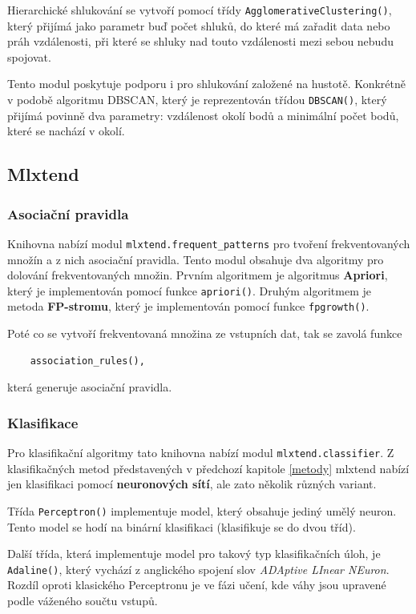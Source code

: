 Hierarchické shlukování se vytvoří pomocí třídy \verb|AgglomerativeClustering()|, který přijímá jako parametr buď počet shluků, do které má zařadit data nebo práh vzdálenosti, při které se shluky nad touto vzdálenosti mezi sebou nebudu spojovat. 

Tento modul poskytuje podporu i pro shlukování založené na hustotě. Konkrétně v podobě algoritmu DBSCAN, který je reprezentován třídou \verb|DBSCAN()|, který přijímá povinně dva parametry: vzdálenost okolí bodů a minimální počet bodů, které se nachází v okolí.

\subsection{Mlxtend}
\subsubsection*{Asociační pravidla}
Knihovna nabízí modul \verb|mlxtend.frequent_patterns| pro tvoření frekventovaných množín a z nich asociační pravidla. Tento modul obsahuje dva algoritmy pro dolování frekventovaných množin. Prvním algoritmem je algoritmus \textbf{Apriori}, který je implementován pomocí funkce \verb|apriori()|. Druhým algoritmem je metoda \textbf{FP-stromu}, který je implementován pomocí funkce \verb|fpgrowth()|. 

Poté co se vytvoří frekventovaná množina ze vstupních dat, tak se zavolá funkce \begin{verbatim}
    association_rules(),
\end{verbatim}která generuje asociační pravidla.

\subsubsection*{Klasifikace}
Pro klasifikační algoritmy tato knihovna nabízí modul \verb|mlxtend.classifier|. Z klasifikačných metod představených v předchozí kapitole \ref{metody} mlxtend nabízí jen klasifikaci pomocí \textbf{neuronových sítí}, ale zato několik různých variant. 

Třída \verb|Perceptron()| implementuje model, který obsahuje jediný umělý neuron. Tento model se hodí na binární klasifikaci (klasifikuje se do dvou tříd). 

Další třída, která implementuje model pro takový typ klasifikačních úloh, je \verb|Adaline()|, který vychází z anglického spojení slov \textit{ADAptive LInear NEuron}. Rozdíl oproti klasického Perceptronu je ve fázi učení, kde váhy jsou upravené podle váženého součtu vstupů.


